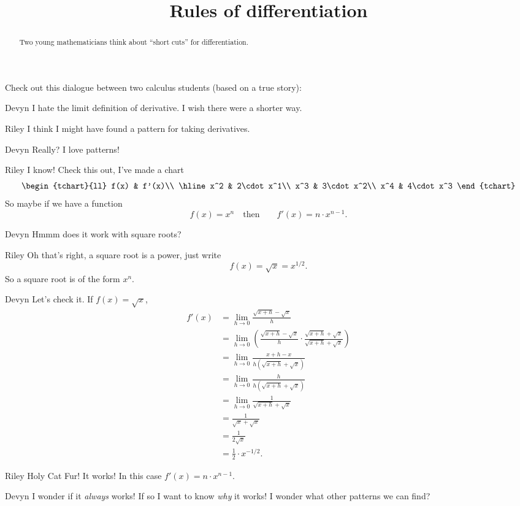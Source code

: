 \documentclass{ximera}
\title[Break-Ground:]{Rules of differentiation}
\begin{document}
\begin{abstract}
Two young mathematicians think about ``short cuts'' for differentiation.
\end{abstract}
\maketitle

Check out this dialogue between two calculus students (based on a true
story):

\begin{dialogue}
\item[Devyn] I hate the limit definition of derivative.  I wish there
  were a shorter way.
\item[Riley] I think I might have found a pattern for taking
  derivatives.
\item[Devyn] Really? I love patterns!
\item[Riley] I know! Check this out, I've made a chart
  \[
  \renewcommand*{\arraystretch}{1.3}
  \begin{tchart}{ll}
    f(x) & f'(x)\\ \hline
    x^2 & 2\cdot x^1\\
    x^3 & 3\cdot x^2\\
    x^4 & 4\cdot x^3
  \end{tchart}
  \]
  So maybe if we have a function
  \[
  f(x) = x^n\quad\text{then}\qquad f'(x) = n\cdot x^{n-1}.
  \]
\item[Devyn] Hmmm does it work with square roots?
\item[Riley] Oh that's right, a square root is a power, just write
  \[
  f(x) = \sqrt{x} = x^{1/2}.
  \]
  So a square root is of the form $x^n$.
\item[Devyn] Let's check it. If $f(x) = \sqrt{x}$,
  \begin{align*}
    f'(x) &= \lim_{h\to 0} \frac{\sqrt{x+h} -\sqrt{x}}{h}\\
    &= \lim_{h\to 0} \left(\frac{\sqrt{x+h} - \sqrt{x}}{h}\cdot \frac{\sqrt{x+h} + \sqrt{x}}{\sqrt{x+h} + \sqrt{x}}\right)\\
    &= \lim_{h\to 0} \frac{x+h - x}{h(\sqrt{x+h} + \sqrt{x})}\\
    &= \lim_{h\to 0} \frac{h}{h(\sqrt{x+h} + \sqrt{x})}\\
    &= \lim_{h\to 0} \frac{1}{\sqrt{x+h} + \sqrt{x}}\\
    &= \frac{1}{\sqrt{x} + \sqrt{x}}\\
    &= \frac{1}{2\sqrt{x}}\\
    &= \frac{1}{2}\cdot x^{-1/2}.
  \end{align*}
\item[Riley] Holy Cat Fur! It works! In this case $f'(x) = n\cdot
  x^{n-1}$.
  \item[Devyn] I wonder if it \textit{always} works! If so I want to
    know \textit{why} it works! I wonder what other patterns we can
    find?
\end{dialogue}
\end{document}
